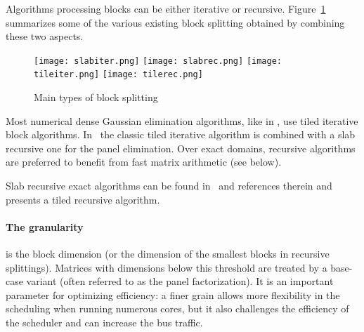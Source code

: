 \documentclass{article}
\begin{document}
 
 
 
 
 
 
Algorithms processing blocks can be either iterative or recursive.
Figure~\ref{fig:blockalg} summarizes some of the various existing block
splitting obtained by combining these two aspects.
\begin{figure}[ht]
\begin{center}
  \texttt{[image: slabiter.png]}
\hfill
  \texttt{[image: slabrec.png]}
\hfill
  \texttt{[image: tileiter.png]}
\hfill
  \texttt{[image: tilerec.png]}\vspace{-5pt}
\end{center}
  \caption{Main types of block splitting}
  \label{fig:blockalg}\vspace{-5pt}  
\end{figure}
Most numerical dense Gaussian elimination algorithms, like in \cite{BLKD07}, use
tiled iterative block algorithms. In~\cite{DFLL11} the classic tiled iterative
algorithm is combined with a slab recursive one for the panel elimination.
Over exact domains, recursive algorithms are preferred to benefit from fast
matrix arithmetic (see below).
 
Slab recursive exact algorithms can be found in~\cite{JPS13} and references therein
and~\cite{DPS13} presents a tiled recursive algorithm.
 
\vspace{-1em}
\paragraph{The granularity} is the block dimension (or the dimension of the
smallest blocks in recursive splittings). 
Matrices with dimensions below this threshold are treated by a
base-case variant (often referred to as the panel factorization).  
It is an important parameter for optimizing efficiency: a finer grain allows
more flexibility in the scheduling when running numerous cores, but it also
challenges the efficiency of the scheduler and can increase the bus traffic.

\vspace{-1em}
\end{document}
